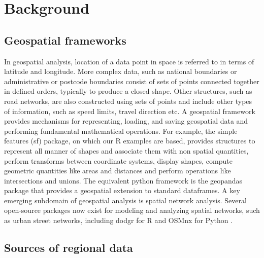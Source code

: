 \documentclass[utf8]{frontiersHLTH}
\begin{document}
\section{Background}\label{background}

\subsection{Geospatial frameworks}\label{geospatial-frameworks}

In geospatial analysis, location of a data point in space is referred to
in terms of latitude and longitude. More complex data, such as
national boundaries or administrative or postcode boundaries consist
of sets of points connected together in defined orders, typically to
produce a closed shape. Other structures, such as road networks, are
also constructed using sets of points and include other types of
information, such as speed limits, travel direction etc. A geospatial
framework provides mechanisms for representing, loading, and saving
geospatial data and performing fundamental mathematical
operations. For example, the simple features (sf) \cite{Pebesma_2018}
package, on which our R examples are based, provides structures to
represent all manner of shapes and associate them with non spatial
quantities, perform transforms between coordinate systems, display
shapes, compute geometric quantities like areas and distances and
perform operations like intersections and unions. The equivalent
python framework is the geopandas package that provides a geospatial
extension to standard dataframes. A key emerging subdomain of 
geospatial analysis is spatial network analysis. Several open-source 
packages now exist for modeling and analyzing spatial networks, 
such as urban street networks, including dodgr for R \cite{Padgham_2019}
and OSMnx for Python \cite{boeing_osmnx_2017}.

\subsection{Sources of regional data}\label{sources-of-regional-data}
\end{document}
